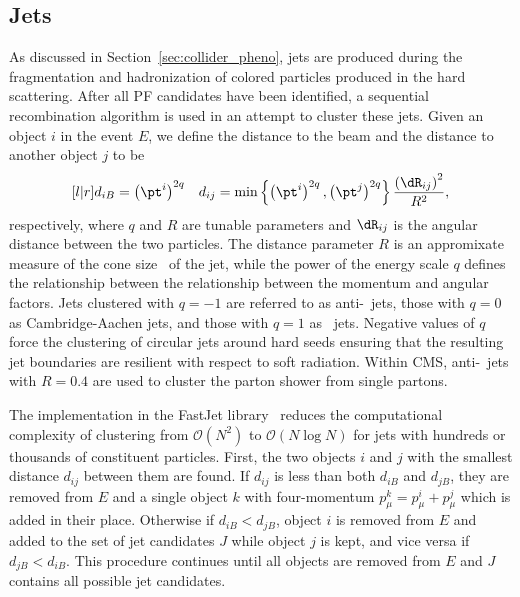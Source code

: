 \subsection{Jets}
\label{sec:pf_jets}

As discussed in Section~\ref{sec:collider_pheno}, jets are produced during the fragmentation and hadronization of colored particles produced in the hard scattering.
After all PF candidates have been identified, a sequential recombination algorithm is used in an attempt to cluster these jets.
Given an object $i$ in the event $E$, we define the distance to the beam and the distance to another object $j$ to be
\begin{equation}
  \begin{matrix}[l | r]
    \displaystyle
    d_{iB} = \left(\pt^i\right)^{2q} &
    d_{ij} = \min \left\{\left(\pt^i\right)^{2q}, \left(\pt^j\right)^{2q} \right\} \dfrac{\left(\dR_{ij}\right)^2}{R^2} ,
  \end{matrix}
\end{equation}
respectively, where $q$ and $R$ are tunable parameters and $\dR_{ij}$ is the angular distance between the two particles. 
The distance parameter $R$ is an appromixate measure of the cone size \dR\ of the jet, while the power of the energy scale $q$ defines the relationship between the relationship between the momentum and angular factors. 
Jets clustered with $q = -1$ are referred to as anti-\kt\ jets, those with $q = 0$ as Cambridge-Aachen jets, and those with $q = 1$ as \kt\ jets.  
Negative values of $q$ force the clustering of circular jets around hard seeds ensuring that the resulting jet boundaries are resilient with respect to soft radiation.
Within CMS, anti-\kt\ jets with $R = 0.4$ are used to cluster the parton shower from single partons.

The implementation in the FastJet library~\cite{Cacciari2012} reduces the computational complexity of clustering from $\mathcal{O}(N^2)$ to $\mathcal{O}(N \log N)$ for jets with hundreds or thousands of constituent particles.
First, the two objects $i$ and $j$ with the smallest distance $d_{ij}$ between them are found. 
If $d_{ij}$ is less than both $d_{iB}$ and $d_{jB}$, they are removed from $E$ and a single object $k$ with four-momentum $p_\mu^k = p_\mu^i + p_\mu^j$ which is added in their place. 
Otherwise if $d_{iB} < d_{jB}$, object $i$ is removed from $E$ and added to the set of jet candidates $J$ while object $j$ is kept, and vice versa if $d_{jB} < d_{iB}$.
This procedure continues until all objects are removed from $E$ and $J$ contains all possible jet candidates.

